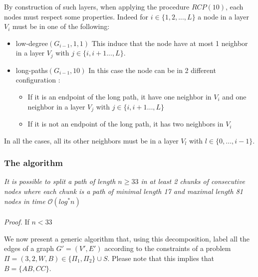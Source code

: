 By construction of such layers, when applying the procedure $RCP(10)$, each nodes must respect some properties. Indeed for $i \in \{1,2,...,L\}$ a node in a layer $V_i$ must be in one of the following:
\begin{itemize}
    \item low-degree$(G_{i-1},1,1)$
    This induce that the node have at most 1 neighbor in a layer $V_j$ with $j \in \{i,i+1...,L\}$.
    
    \item long-paths$(G_{i-1},10)$
    In this case the node can be in 2 different configuration :
    \begin{itemize}
        \item If it is an endpoint of the long path, it have one neighbor in $V_i$ and one neighbor in a layer $V_j$ with $j \in \{i,i+1...,L\}$ 
        \item If it is not an endpoint of the long path, it has two neighbors in $V_i$
    \end{itemize}
\end{itemize}
In all the cases, all its other neighbors must be in a layer $V_l$ with $l \in \{0,...,i-1\}$.

\subsubsection{The algorithm}

\begin{claim}\label{claim:path} \textit{It is possible to split a path of length $n\geq 33$ in at least 2 chunks of consecutive nodes where each chunk is a path of minimal length 17 and maximal length 81 nodes in time $\mathcal{O}(log^*n)$}\\\\
\textit{Proof.} If $n<33$

\end{claim}
We now present a generic algorithm that, using this decomposition, label all the edges of a graph $G'=(V',E')$ according to the constraints of a problem $\Pi=(3,2,W,B) \in \{\Pi_1,\Pi_2\}\cup S$. Please note that this implies that $B=\{AB,CC\}$.

